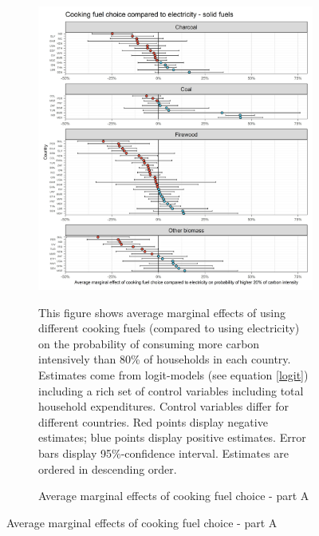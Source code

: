  \begin{figure}[ht!]\ContinuedFloat
   \centering
   \begin{subfigure}[b]{\textwidth}
   \centering
   \caption{Average marginal effects of cooking fuel choice - part A} \label{fig:Logit_ME_CF_1}
   \includegraphics{1_Figures/Analysis_Logit_Models_Marginal_Effects/Average_Marginal_Effects_affected_upper_80_CF_Electricity A_2017.jpg}
   \begin{subcaption2}
     This figure shows average marginal effects of using different cooking fuels (compared to using electricity) on the probability of consuming more carbon intensively than 80\% of households in each country. Estimates come from logit-models (see equation \ref{logit}) including a rich set of control variables including total household expenditures. Control variables differ for different countries. Red points display negative estimates; blue points display positive estimates. Error bars display 95\%-confidence interval. Estimates are ordered in descending order.
   \end{subcaption2}
   \end{subfigure}
 \end{figure}
 \clearpage

